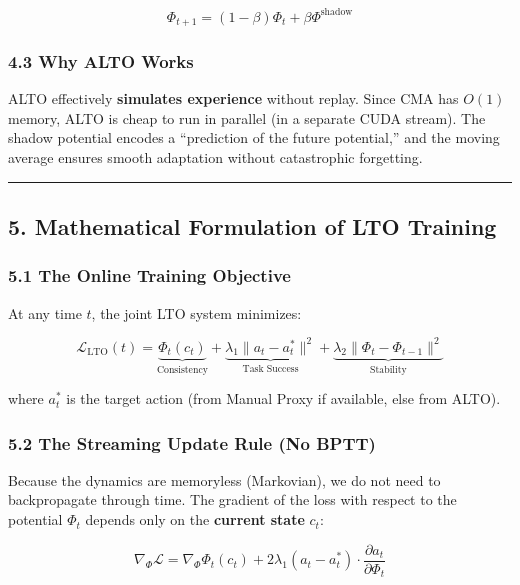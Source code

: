 \documentclass[
  11pt,
  a4paper,
]{article}
\begin{document}
\[\Phi_{t+1} = (1 - \beta) \Phi_t + \beta \Phi^{\text{shadow}}\]

\subsubsection{4.3 Why ALTO Works}\label{why-alto-works}

ALTO effectively \textbf{simulates experience} without replay. Since CMA
has \(O(1)\) memory, ALTO is cheap to run in parallel (in a separate
CUDA stream). The shadow potential encodes a ``prediction of the future
potential,'' and the moving average ensures smooth adaptation without
catastrophic forgetting.

\begin{center}\rule{0.5\linewidth}{0.5pt}\end{center}

\subsection{5. Mathematical Formulation of LTO
Training}\label{mathematical-formulation-of-lto-training}

\subsubsection{5.1 The Online Training
Objective}\label{the-online-training-objective}

At any time \(t\), the joint LTO system minimizes:

\[\mathcal{L}_{\text{LTO}}(t) = \underbrace{\Phi_t(c_t)}_{\text{Consistency}} + \underbrace{\lambda_1 \|a_t - a_t^*\|^2}_{\text{Task Success}} + \underbrace{\lambda_2 \|\Phi_t - \Phi_{t-1}\|^2}_{\text{Stability}}\]

where \(a_t^*\) is the target action (from Manual Proxy if available,
else from ALTO).

\subsubsection{5.2 The Streaming Update Rule (No
BPTT)}\label{the-streaming-update-rule-no-bptt}

Because the dynamics are memoryless (Markovian), we do not need to
backpropagate through time. The gradient of the loss with respect to the
potential \(\Phi_t\) depends only on the \textbf{current state} \(c_t\):

\[\nabla_{\Phi} \mathcal{L} = \nabla_{\Phi} \Phi_t(c_t) + 2\lambda_1 (a_t - a_t^*) \cdot \frac{\partial a_t}{\partial \Phi_t}\]
\end{document}
